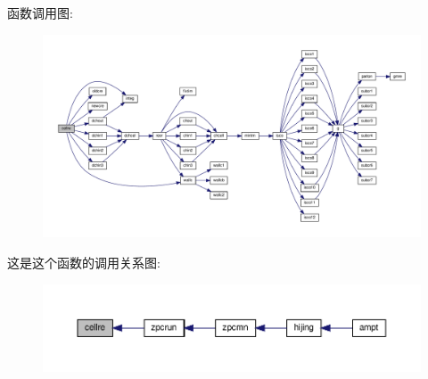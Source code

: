 函数调用图\+:
\nopagebreak
\begin{figure}[H]
\begin{center}
\leavevmode
\includegraphics[width=350pt]{cellre_8f90_ac2b1b812cd9e114b826ecf72131a6428_cgraph}
\end{center}
\end{figure}
这是这个函数的调用关系图\+:
\nopagebreak
\begin{figure}[H]
\begin{center}
\leavevmode
\includegraphics[width=350pt]{cellre_8f90_ac2b1b812cd9e114b826ecf72131a6428_icgraph}
\end{center}
\end{figure}

